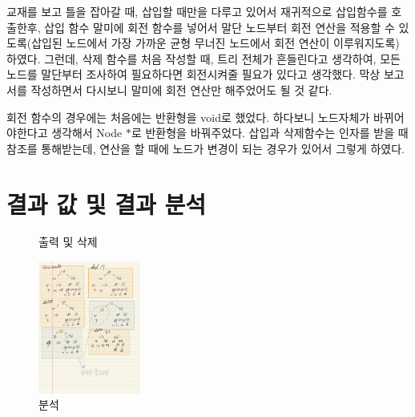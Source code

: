 \documentclass[a4paper,11pt]{article}
\begin{document}
교재를 보고 틀을 잡아갈 때, 삽입할 때만을 다루고 있어서 재귀적으로 삽입함수를 호출한후, 삽입 함수 말미에 회전 함수를  넣어서 말단 노드부터 회전 연산을 적용할 수 있도록(삽입된 노드에서 가장 가까운 균형 무너진 노드에서 회전 연산이 이루워지도록) 하였다. 그런데, 삭제 함수를 처음 작성할 때, 트리 전체가 흔들린다고 생각하여, 모든 노드를 말단부터 조사하여 필요하다면 회전시켜줄 필요가 있다고 생각했다. 막상 보고서를 작성하면서 다시보니  말미에 회전 연산만 해주었어도 될 것 같다. 

회전 함수의 경우에는 처음에는 반환형을 void로 했었다. 하다보니 노드자체가 바뀌어야한다고 생각해서 Node $*$로 반환형을 바꿔주었다. 삽입과 삭제함수는 인자를 받을 때 참조를 통해받는데, 연산을 할 때에 노드가 변경이 되는 경우가 있어서 그렇게 하였다.
\newpage
\section{결과 값 및 결과 분석}

\begin{figure}[h]
\caption{출력 및 삭제}
\label{fig:fig2}
\end{figure}
\begin{figure}[h]
\begin{center}
\includegraphics[width=0.3\textwidth]{result}
\caption{분석}
\label{fig:fig3}
\end{center}
\end{figure}
\end{document}
